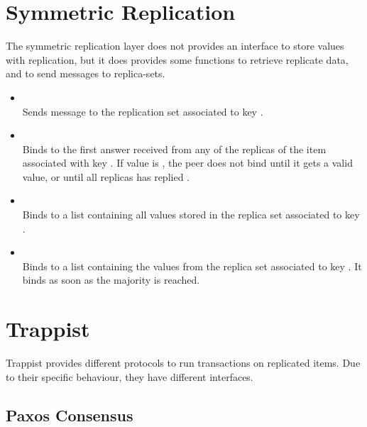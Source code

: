 \section{Symmetric Replication}

The symmetric replication layer does not provides an interface to store values
with replication, but it does provides some functions to retrieve replicate
data, and to send messages to replica-sets.

\begin{itemize}

\item {}\\ Sends message  to the replication
set associated to key .

\item {}\\ Binds  to the first answer received
from any of the replicas of the item associated with key . If value
is , the peer does not bind  until it gets a valid
value, or until all replicas has replied . 

\item {}\\ Binds  to a list containing all
values stored in the replica set associated to key .

\item {}\\ Binds  to a list containing
the values from the replica set associated to key . It binds
 as soon as the majority is reached.

\end{itemize}

\section{Trappist}

Trappist provides different protocols to run transactions on replicated items.
Due to their specific behaviour, they have different interfaces.

\subsection{Paxos Consensus}

